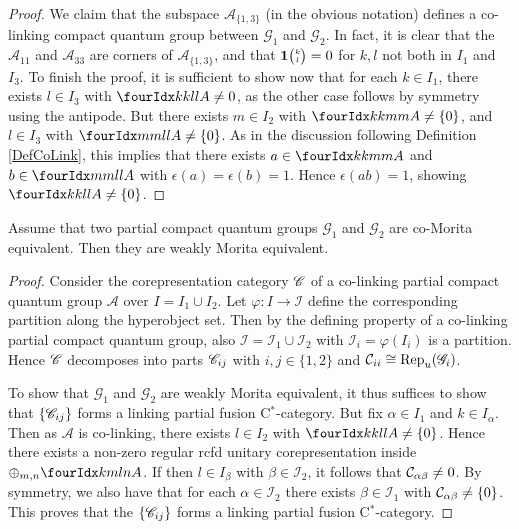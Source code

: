 \begin{proof}
We claim that the subspace $\mathscr{A}_{\{1,3\}}$ (in the obvious notation) defines a co-linking compact quantum group between $\mathscr{G}_1$ and $\mathscr{G}_2$. In fact, it is clear that the $\mathscr{A}_{11}$ and $\mathscr{A}_{33}$ are corners of $\mathscr{A}_{\{1,3\}}$, and that $\mathbf{1}{\tiny {\begin{pmatrix} k\\l\end{pmatrix}}}=0$ for $k,l$ not both in $I_1$ and $I_{3}$. To finish the proof, it is sufficient to show now that for each $k\in I_1$, there exists $l\in I_{3}$ with $\Gr{A}{k}{l}{k}{l}\neq 0$, as the other case follows by symmetry using the antipode. But there exists $m\in I_2$ with $\Gr{A}{k}{m}{k}{m} \neq \{0\}$, and $l\in I_3$ with $\Gr{A}{m}{l}{m}{l}\neq\{0\}$. As in the discussion following Definition \ref{DefCoLink}, this implies that there exists $a\in \Gr{A}{k}{m}{k}{m}$ and $b\in \Gr{A}{m}{l}{m}{l}$ with $\epsilon(a)=\epsilon(b)=1$. Hence $\epsilon(ab)=1$, showing $\Gr{A}{k}{l}{k}{l}\neq \{0\}$.
\end{proof} 

\begin{Prop}\label{PropCoWeak} Assume that two partial compact quantum groups $\mathscr{G}_1$ and $\mathscr{G}_2$ are co-Morita equivalent. Then they are weakly Morita equivalent.
\end{Prop} 
\begin{proof} 
Consider the corepresentation category $\mathscr{C}$ of a co-linking partial compact quantum group $\mathscr{A}$ over $I = I_1\cup I_2$. Let $\varphi:I\rightarrow \mathscr{I}$ define the corresponding partition along the hyperobject set. Then by the defining property of a co-linking partial compact quantum group, also $\mathscr{I} = \mathscr{I}_1\cup \mathscr{I}_2$ with $\mathscr{I}_i=\varphi(I_i)$ is a partition. Hence $\mathscr{C}$ decomposes into parts $\mathscr{C}_{ij}$ with $i,j\in \{1,2\}$ and $\mathcal{C}_{ii}\cong \mathrm{Rep}_u(\mathscr{G}_i)$. 

To show that $\mathscr{G}_1$ and $\mathscr{G}_2$ are weakly Morita equivalent, it thus suffices to show that $\{\mathscr{C}_{ij}\}$ forms a linking partial fusion C$^*$-category. But fix $\alpha\in I_1$ and $k\in I_{\alpha}$. Then as $\mathscr{A}$ is co-linking, there exists $l \in I_2$ with $\Gr{A}{k}{l}{k}{l}\neq \{0\}$. Hence there exists a non-zero regular rcfd unitary corepresentation inside $\oplus_{m,n}\Gr{A}{k}{l}{m}{n}$. If then $l\in I_{\beta}$ with $\beta\in \mathscr{I}_2$, it follows that $\mathcal{C}_{\alpha\beta}\neq 0$. By symmetry, we also have that for each $\alpha \in \mathscr{I}_2$ there exists $\beta \in \mathscr{I}_1$ with $\mathcal{C}_{\alpha\beta}\neq \{0\}$. This proves that the $\{\mathscr{C}_{ij}\}$ forms a linking partial fusion C$^*$-category.
\end{proof}

